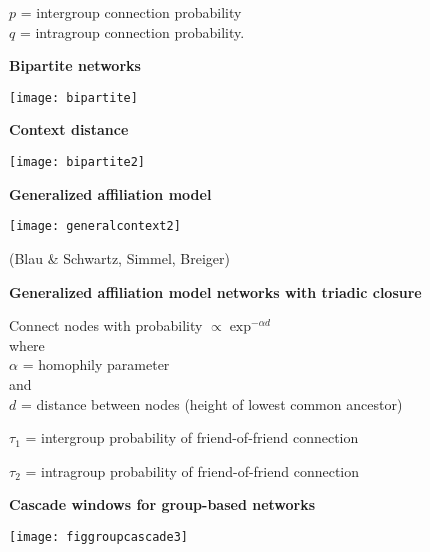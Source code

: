{{{{    $p$ = intergroup connection probability\\
    $q$ = intragroup connection probability.
  
 

  \textbf{Bipartite networks}
 
   \centering
   \texttt{[image: bipartite]}
 
 
 
 
 

  \textbf{Context distance}
 
   \centering
   \texttt{[image: bipartite2]}
  

  \textbf{Generalized affiliation model}
 
   \centering
   \texttt{[image: generalcontext2]}
 
   (Blau \& Schwartz, Simmel, Breiger)
 
 
 


  \textbf{Generalized affiliation model networks with triadic closure}

  
    
     Connect nodes with probability $\propto \exp^{-\alpha d}$\\
      where\\
      $\alpha$ = homophily parameter\\
      and \\
      $d$ = distance between nodes (height of lowest common ancestor)
    
      $\tau_1$ = intergroup probability of friend-of-friend connection
    
      $\tau_2$ = intragroup probability of friend-of-friend connection
    
  
 

  \textbf{Cascade windows for group-based networks}

  \texttt{[image: figgroupcascade3]}\\



}}}}
